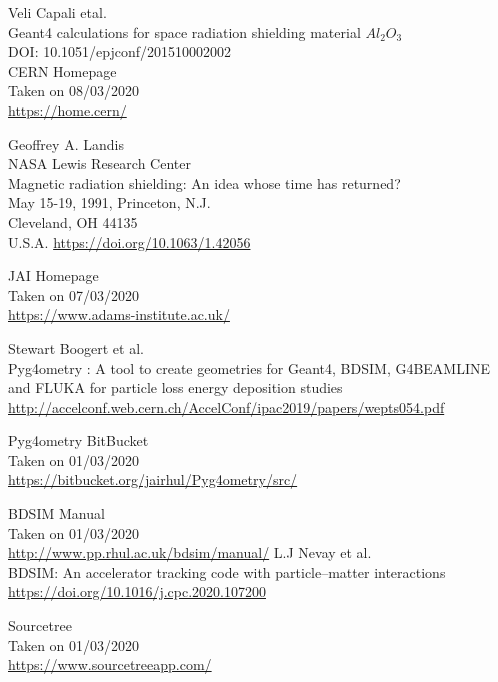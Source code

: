 \documentclass[12pt,a4paper]{article}
\begin{document}
\newpage
\newpage
\footnotesize
\begin{thebibliography}{1}

	Veli Capali etal.\\
	Geant4 calculations for space radiation shielding material $Al_2O_3$\\
	DOI: 10.1051/epjconf/201510002002\\
	

	CERN Homepage\\
	Taken on 08/03/2020\\
	\url{https://home.cern/}
	
	Geoffrey A. Landis\\
	NASA Lewis Research Center\\
	Magnetic radiation shielding: An idea whose time has returned?\\
	May 15-19, 1991, Princeton, N.J.\\
	Cleveland, OH 44135\\
	U.S.A.
	\url{https://doi.org/10.1063/1.42056}
	
	JAI Homepage\\
	Taken on 07/03/2020\\
	\url{https://www.adams-institute.ac.uk/}

	Stewart Boogert et al.\\
	Pyg4ometry : A tool to create geometries for Geant4, BDSIM, G4BEAMLINE and FLUKA for particle loss energy deposition studies\\
	\url{http://accelconf.web.cern.ch/AccelConf/ipac2019/papers/wepts054.pdf}

	Pyg4ometry BitBucket\\
	Taken on 01/03/2020\\
	\url{https://bitbucket.org/jairhul/Pyg4ometry/src/}
	
	\bibitem{}
		BDSIM Manual\\
		Taken on 01/03/2020\\
		\url{http://www.pp.rhul.ac.uk/bdsim/manual/}
	\bibitem{}
		L.J Nevay et al.\\
		BDSIM: An accelerator tracking code with particle–matter interactions\\
		\url{https://doi.org/10.1016/j.cpc.2020.107200}
		
		Sourcetree\\
		Taken on 01/03/2020\\
		\url{https://www.sourcetreeapp.com/}
		

\end{thebibliography}
\end{document}
